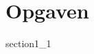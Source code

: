 \documentclass[class=report, crop=false]{standalone}
\begin{document}
    \chapter{Opgaven}
    \label{kapitel1}
    {section1_1}
\end{document}
